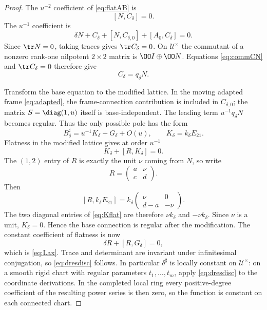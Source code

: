 \begin{proof}
The $u^{-2}$ coefficient of \eqref{eq:flatAB} is
\begin{equation}\label{eq:commCN}
  [N,C_\delta]=0.
\end{equation}
The $u^{-1}$ coefficient is
\begin{equation}\label{eq:u-1flat}
  \delta N+C_\delta+[N,C_{\delta,0}]+[A_0,C_\delta]=0.
\end{equation}
Since $\tr N=0$, taking traces gives $\tr C_\delta=0$.  On
$\mathcal U^\times$ the commutant of a nonzero rank-one nilpotent
$2\times2$ matrix is
$\OO I\oplus\OO N$.  Equations \eqref{eq:commCN} and
$\tr C_\delta=0$ therefore give
\begin{equation}\label{eq:CqN}
  C_\delta=q_\delta N.
\end{equation}

Transform the base equation to the modified lattice.  In the moving adapted
frame \eqref{eq:adapted}, the frame-connection contribution is included in
$C_{\delta,0}$; the matrix $S=\diag(1,u)$ itself is base-independent.  The
leading term $u^{-1}q_\delta N$ becomes regular.  Thus the only possible pole
has the form
\begin{equation}\label{eq:Bsharp}
  B_\delta^\sharp=u^{-1}K_\delta+G_\delta+O(u),
  \qquad K_\delta=k_\delta E_{21}.
\end{equation}
Flatness in the modified lattice gives at order $u^{-1}$
\begin{equation}\label{eq:Kflat}
  K_\delta+[R,K_\delta]=0.
\end{equation}
The $(1,2)$ entry of $R$ is exactly the unit $\nu$ coming from $N$, so write
\[
  R=\begin{pmatrix}a&\nu\\ c&d\end{pmatrix}.
\]
Then
\[
  [R,k_\delta E_{21}]
  =k_\delta
    \begin{pmatrix}\nu&0\\ d-a&-\nu\end{pmatrix}.
\]
The two diagonal entries of \eqref{eq:Kflat} are therefore
$\nu k_\delta$ and $-\nu k_\delta$.  Since $\nu$ is a unit,
$K_\delta=0$.  Hence the base connection is regular after the modification.
The constant coefficient of flatness is now
\[
  \delta R+[R,G_\delta]=0,
\]
which is \eqref{eq:Lax}.  Trace and determinant are invariant under
infinitesimal conjugation, so \eqref{eq:dresdisc} follows.  In particular
$\delta^\sharp$ is locally constant on $\mathcal U^\times$: on a smooth
rigid chart with regular parameters $t_1,\ldots,t_m$, apply
\eqref{eq:dresdisc} to the coordinate derivations.  In the completed local
ring every positive-degree coefficient of the resulting power series is
then zero, so the function is constant on each connected chart.
%
\end{proof}

